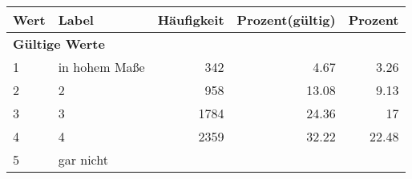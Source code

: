      \begin{longtable}{lXrrr}
     \toprule
     \textbf{Wert} & \textbf{Label} & \textbf{Häufigkeit} & \textbf{Prozent(gültig)} & \textbf{Prozent} \\
     \endhead
     \midrule
     \multicolumn{5}{l}{\textbf{Gültige Werte}}\\

     1 &
     \multicolumn{1}{X}{ in hohem Maße   } &


       \num{342} &
       \num[round-mode=places,round-precision=2]{4.67} &
         \num[round-mode=places,round-precision=2]{3.26} \\

     2 &
     \multicolumn{1}{X}{ 2   } &


       \num{958} &
       \num[round-mode=places,round-precision=2]{13.08} &
         \num[round-mode=places,round-precision=2]{9.13} \\

     3 &
     \multicolumn{1}{X}{ 3   } &


       \num{1784} &
       \num[round-mode=places,round-precision=2]{24.36} &
         \num[round-mode=places,round-precision=2]{17} \\

     4 &
     \multicolumn{1}{X}{ 4   } &


       \num{2359} &
       \num[round-mode=places,round-precision=2]{32.22} &
         \num[round-mode=places,round-precision=2]{22.48} \\

     5 &
     \multicolumn{1}{X}{ gar nicht   } &



\end{longtable}
